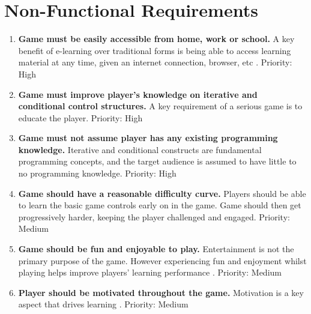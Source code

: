 \documentclass[a4paper,11.5pt]{report}
\numberwithin{figure}{section}
\numberwithin{table}{section}
\numberwithin{equation}{section}
\numberwithin{equation}{section}
\begin{document}





\section{Non-Functional Requirements}

\begin{enumerate}[label=3.1.\arabic*]

  \item \textbf{Game must be easily accessible from home, work or school.} A key benefit of e-learning over traditional forms is being able to access learning material at any time, given an internet connection, browser, etc \citep{Girard2013}. \newline Priority: High

  \item \textbf{Game must improve player's knowledge on iterative and conditional control structures.} A key requirement of a serious game is to educate the player. \newline Priority: High
  
  \item \textbf{Game must not assume player has any existing programming knowledge.} Iterative and conditional constructs are fundamental programming concepts, and the target audience is assumed to have little to no programming knowledge. \newline Priority: High
  
  \item \textbf{Game should have a reasonable difficulty curve.} Players should be able to learn the basic game controls early on in the game. Game should then get progressively harder, keeping the player challenged and engaged. \newline Priority: Medium
  
  \item \textbf{Game should be fun and enjoyable to play.} Entertainment is not the primary purpose of the game. However experiencing fun and enjoyment whilst playing helps improve players' learning performance \citep{giannakos2013}. \newline Priority: Medium
  
  \item \textbf{Player should be motivated throughout the game.} Motivation is a key aspect that drives learning \citep{Gee2003}. \newline Priority: Medium
  

\end{enumerate}
\end{document}
